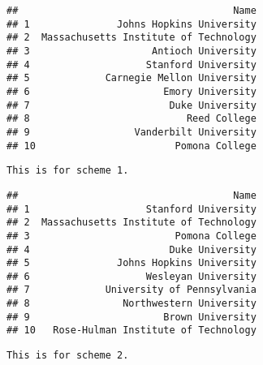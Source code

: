 \documentclass[]{article}
\newenvironment{Shaded}{\begin{snugshade}}{\end{snugshade}}
\newcommand{\KeywordTok}[1]{\textcolor[rgb]{0.13,0.29,0.53}{\textbf{#1}}}
\newcommand{\DecValTok}[1]{\textcolor[rgb]{0.00,0.00,0.81}{#1}}
\newcommand{\StringTok}[1]{\textcolor[rgb]{0.31,0.60,0.02}{#1}}
\newcommand{\OperatorTok}[1]{\textcolor[rgb]{0.81,0.36,0.00}{\textbf{#1}}}
\newcommand{\NormalTok}[1]{#1}
\begin{document}
\begin{verbatim}
##                                     Name
## 1               Johns Hopkins University
## 2  Massachusetts Institute of Technology
## 3                     Antioch University
## 4                    Stanford University
## 5             Carnegie Mellon University
## 6                       Emory University
## 7                        Duke University
## 8                           Reed College
## 9                  Vanderbilt University
## 10                        Pomona College
\end{verbatim}

\begin{verbatim}
This is for scheme 1.
\end{verbatim}

\begin{Shaded}
\end{Shaded}

\begin{verbatim}
##                                     Name
## 1                    Stanford University
## 2  Massachusetts Institute of Technology
## 3                         Pomona College
## 4                        Duke University
## 5               Johns Hopkins University
## 6                    Wesleyan University
## 7             University of Pennsylvania
## 8                Northwestern University
## 9                       Brown University
## 10   Rose-Hulman Institute of Technology
\end{verbatim}

\begin{verbatim}
This is for scheme 2.
\end{verbatim}

\begin{Shaded}
\end{Shaded}
\end{document}
